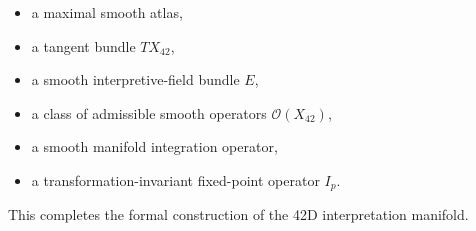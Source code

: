 \begin{itemize}
    \item a maximal smooth atlas,
    \item a tangent bundle $TX_{42}$,
    \item a smooth interpretive-field bundle $E$,
    \item a class of admissible smooth operators $\mathcal{O}(X_{42})$,
    \item a smooth manifold integration operator,
    \item a transformation-invariant fixed-point operator $I_p$.
\end{itemize}

This completes the formal construction of the 42D interpretation manifold.

